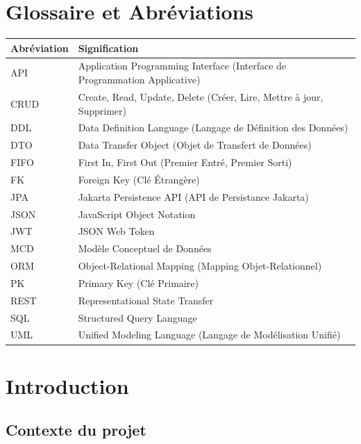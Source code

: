 \documentclass[12pt,a4paper,twoside]{report}
\begin{document}
\chapter*{Glossaire et Abréviations}

\begin{longtable}{p{3.5cm} p{11cm}}
\hline
\textbf{Abréviation} & \textbf{Signification} \\
\hline
\endfirsthead
\hline
\endfoot
API & Application Programming Interface (Interface de Programmation Applicative) \\
CRUD & Create, Read, Update, Delete (Créer, Lire, Mettre à jour, Supprimer) \\
DDL & Data Definition Language (Langage de Définition des Données) \\
DTO & Data Transfer Object (Objet de Transfert de Données) \\
FIFO & First In, First Out (Premier Entré, Premier Sorti) \\
FK & Foreign Key (Clé Étrangère) \\
JPA & Jakarta Persistence API (API de Persistance Jakarta) \\
JSON & JavaScript Object Notation \\
JWT & JSON Web Token \\
MCD & Modèle Conceptuel de Données \\
ORM & Object-Relational Mapping (Mapping Objet-Relationnel) \\
PK & Primary Key (Clé Primaire) \\
REST & Representational State Transfer \\
SQL & Structured Query Language \\
UML & Unified Modeling Language (Langage de Modélisation Unifié) \\
\hline
\end{longtable}

\newpage

\chapter{Introduction}

\section{Contexte du projet}
\end{document}
